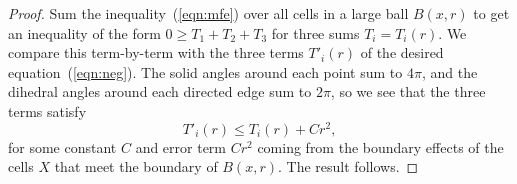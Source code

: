 \begin{proof}
Sum the inequality~(\ref{eqn:mfe}) over all cells in a large ball $B(x,r)$ to get an
inequality of the form $0\ge T_1 + T_2 + T_3$ for three sums $T_i = T_i(r)$.  We compare this term-by-term
with the three terms $T'_i(r)$ of the desired equation~(\ref{eqn:neg}).  The solid angles around each point sum to
$4\pi$, and the dihedral angles around each directed edge sum to $2\pi$, so we see that
the three terms satisfy
$$T'_i(r) \le T_i(r) + C r^2,$$
for some constant $C$ and error term $C r^2$ coming from the boundary effects of the cells $X$ that meet the boundary of $B(x,r)$.  The result follows.
\end{proof}


